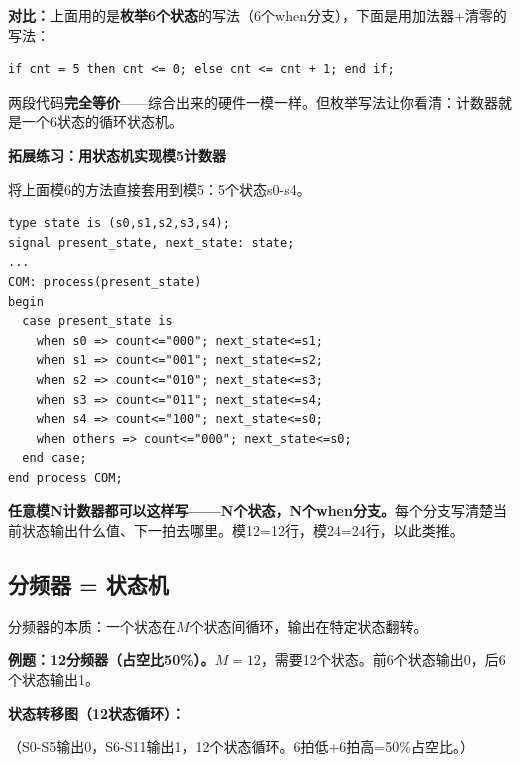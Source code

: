 \textbf{对比：}上面用的是\textbf{枚举6个状态}的写法（6个when分支），下面是用加法器+清零的写法：

\begin{lstlisting}[caption={模6计数器——传统写法（等价但更简洁）}]
  if cnt = 5 then cnt <= 0; else cnt <= cnt + 1; end if;
\end{lstlisting}

两段代码\textbf{完全等价}——综合出来的硬件一模一样。但枚举写法让你看清：计数器就是一个6状态的循环状态机。

\textbf{拓展练习：用状态机实现模5计数器}

将上面模6的方法直接套用到模5：5个状态s0-s4。

\begin{lstlisting}[caption={模5计数器——直观状态机写法}]
type state is (s0,s1,s2,s3,s4);
signal present_state, next_state: state;
...
COM: process(present_state)
begin
  case present_state is
    when s0 => count<="000"; next_state<=s1;
    when s1 => count<="001"; next_state<=s2;
    when s2 => count<="010"; next_state<=s3;
    when s3 => count<="011"; next_state<=s4;
    when s4 => count<="100"; next_state<=s0;
    when others => count<="000"; next_state<=s0;
  end case;
end process COM;
\end{lstlisting}

\textbf{任意模N计数器都可以这样写——N个状态，N个when分支。}每个分支写清楚当前状态输出什么值、下一拍去哪里。模12=12行，模24=24行，以此类推。

\subsection{分频器 = 状态机}

分频器的本质：一个状态在$M$个状态间循环，输出在特定状态翻转。

\textbf{例题：12分频器（占空比50\%）。}$M=12$，需要12个状态。前6个状态输出0，后6个状态输出1。

\textbf{状态转移图（12状态循环）：}
\begin{center}
\end{center}
（S0-S5输出0，S6-S11输出1，12个状态循环。6拍低+6拍高=50\%占空比。）

